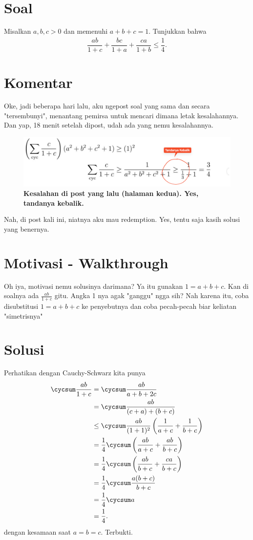 \section{Soal}
Misalkan $a,b,c > 0$ dan memenuhi $a+b+c=1$. Tunjukkan bahwa
\begin{align*}
\dfrac{ab}{1+c}+\dfrac{bc}{1+a}+\dfrac{ca}{1+b} \le \dfrac{1}{4}.
\end{align*}

\newpage
\section{Komentar}
Oke, jadi beberapa hari lalu, aku ngepost soal yang sama dan secara "tersembunyi", menantang pemirsa untuk mencari dimana letak kesalahannya. Dan yap, 18 menit setelah dipost, udah ada yang nemu kesalahannya.

\begin{figure}[h]
    \centering
    \includegraphics[scale=0.2]{18/redemption-mistake.png}
    \caption{\textbf{Kesalahan di post yang lalu (halaman kedua). Yes, tandanya kebalik.}}
\end{figure}

Nah, di post kali ini, niatnya aku mau redemption. Yes, tentu saja kasih solusi yang benernya.

\section{Motivasi - Walkthrough}
Oh iya, motivasi nemu solusinya darimana? Ya itu gunakan $1=a+b+c$. Kan di soalnya ada $\frac{ab}{1+c}$ gitu. Angka 1 nya agak "ganggu" ngga sih? Nah karena itu, coba disubstitusi $1=a+b+c$ ke penyebutnya dan coba pecah-pecah biar keliatan "simetrisnya"

\newpage
\section{Solusi}

    Perhatikan dengan Cauchy-Schwarz kita punya
    \begin{align*}
        \cycsum \dfrac{ab}{1+c} &= \cycsum \dfrac{ab}{a+b+2c}\\
        &= \cycsum \dfrac{ab}{(c+a)+(b+c)}\\
        &\le \cycsum \dfrac{ab}{(1+1)^2}\left(\dfrac{1}{a+c} + \dfrac{1}{b+c}\right)\\
        &= \dfrac{1}{4} \cycsum \left(\dfrac{ab}{a+c} + \dfrac{ab}{b+c}\right)\\
        &= \dfrac{1}{4}\cycsum \left(\dfrac{ab}{b+c}+\dfrac{ca}{b+c}\right)\\
        &= \dfrac{1}{4}\cycsum \dfrac{a(b+c)}{b+c}\\
        &= \dfrac{1}{4}\cycsum a\\
        &= \dfrac{1}{4}.
    \end{align*}
    dengan kesamaan saat $a=b=c$. Terbukti.
